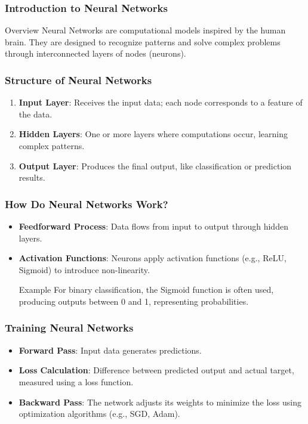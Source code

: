 \documentclass[aspectratio=169]{beamer}
\begin{document}
\frame{\titlepage}

\begin{frame}[fragile]
    \frametitle{Introduction to Neural Networks}
    \begin{block}{Overview}
        Neural Networks are computational models inspired by the human brain. They are designed to recognize patterns and solve complex problems through interconnected layers of nodes (neurons).
    \end{block}
\end{frame}

\begin{frame}[fragile]
    \frametitle{Structure of Neural Networks}
    \begin{enumerate}
        \item \textbf{Input Layer}: Receives the input data; each node corresponds to a feature of the data.
        
        \item \textbf{Hidden Layers}: One or more layers where computations occur, learning complex patterns.
        
        \item \textbf{Output Layer}: Produces the final output, like classification or prediction results.
    \end{enumerate}
\end{frame}

\begin{frame}[fragile]
    \frametitle{How Do Neural Networks Work?}
    \begin{itemize}
        \item \textbf{Feedforward Process}: Data flows from input to output through hidden layers.
        
        \item \textbf{Activation Functions}: Neurons apply activation functions (e.g., ReLU, Sigmoid) to introduce non-linearity.
        
        \begin{block}{Example}
            For binary classification, the Sigmoid function is often used, producing outputs between 0 and 1, representing probabilities.
        \end{block}
    \end{itemize}
\end{frame}

\begin{frame}[fragile]
    \frametitle{Training Neural Networks}
    \begin{itemize}
        \item \textbf{Forward Pass}: Input data generates predictions.
        
        \item \textbf{Loss Calculation}: Difference between predicted output and actual target, measured using a loss function.
        
        \item \textbf{Backward Pass}: The network adjusts its weights to minimize the loss using optimization algorithms (e.g., SGD, Adam).
    \end{itemize}
\end{frame}
\end{document}
